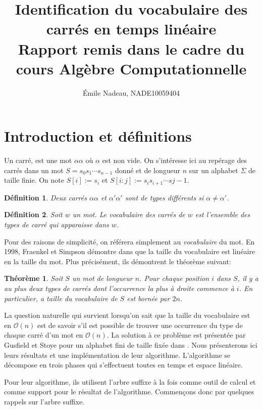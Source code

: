 \documentclass[10pt,letterpaper,oneside]{article}
\author{Émile Nadeau, NADE10059404}
\title{Identification du vocabulaire des carrés en temps linéaire \\ \small Rapport remis dans le cadre du cours Algèbre Computationnelle}
\newtheorem{definition}{Définition}
\newtheorem{theorem}{Théorème}
\newcommand{\bigo}{\mathcal{O}}
\begin{document}
    \maketitle
    \section{Introduction et définitions}
    Un carré, est une mot $\alpha\alpha$ où $\alpha$ est non vide. On s'intéresse ici au repérage des carrés dans un mot $S=s_0s_1\cdots s_{n-1}$  donné et de longueur $n$ sur un alphabet $\Sigma$ de taille finie. On note $S[i]:=s_i$ et $S[i:j]:=s_is_{i+1}\cdots s{j-1}$.
    \begin{definition}
        Deux carrés $\alpha\alpha$ et $\alpha'\alpha'$ sont de \emph{types} différents si $\alpha\neq \alpha'$.
    \end{definition}
    \begin{definition}
        Soit $w$ un mot. Le \emph{vocabulaire des carrés} de $w$ est l'ensemble des types de carré qui apparaisse dans $w$.
    \end{definition}
    Pour des raisons de simplicité, on référera simplement au \emph{vocabulaire} du mot.  En 1998, Fraenkel et Simpson démontre dans \cite{MR1616571} que la taille du vocabulaire est linéaire en la taille du mot. Plus précisément, ils démontrent le théorème suivant:
    \begin{theorem} \label{thm:bornecarre}
        Soit $S$ un mot de longueur $n$. Pour chaque position $i$ dans $S$, il y a au plus deux types de carrés dont l'occurrence la plus à droite commence à $i$.
        En particulier, a taille du vocabulaire de $S$ est bornée par $2n$.
    \end{theorem}
    La question naturelle qui survient lorsqu'on sait que la taille du vocabulaire est en $\bigo(n)$ est de savoir s'il est possible de trouver une occurrence du type de chaque carré d'un mot en $\bigo(n)$. La solution à ce problème est présentée par Gusfield et Stoye pour un alphabet fini de taille fixée dans \cite{MR2096375}. Nous présenterons ici leurs résultats et une implémentation de leur algorithme.  L'algorithme se décompose en trois phases qui s'effectuent toutes en temps et espace linéaire.
    
    Pour leur algorithme, ils utilisent l'arbre suffixe à la fois comme outil de calcul et comme support pour le résultat de l'algorithme. Commençons donc par quelques rappels sur l'arbre suffixe.
    
\end{document}
